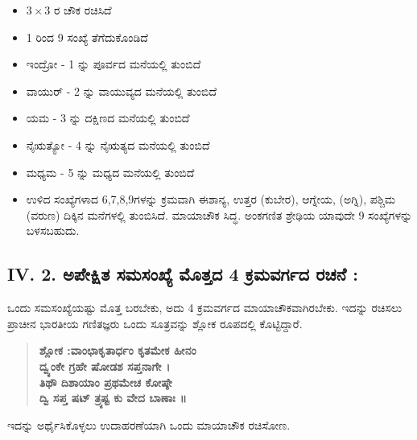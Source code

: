 \begin{itemize}
	\item $3 \times 3$ ರ ಚೌಕ ರಚಿಸಿದೆ
	\item 1 ರಿಂದ 9 ಸಂಖ್ಯೆ ತೆಗೆದುಕೊಂಡಿದೆ
	\item ಇಂದ್ರೋ - 1 ನ್ನು ಪೂರ್ವದ ಮನೆಯಲ್ಲಿ ತುಂಬಿದೆ
	\item ವಾಯುರ್ - 2 ನ್ನು ವಾಯುವ್ಯದ ಮನೆಯಲ್ಲಿ ತುಂಬಿದೆ
	\item ಯಮ - 3 ನ್ನು ದಕ್ಷಿಣದ ಮನೆಯಲ್ಲಿ ತುಂಬಿದೆ
	\item ನೈಋತ್ಯೋ - 4 ನ್ನು ನೈಋತ್ಯದ ಮನೆಯಲ್ಲಿ ತುಂಬಿದೆ
	\item ಮಧ್ಯಮ - 5 ನ್ನು ಮಧ್ಯದ ಮನೆಯಲ್ಲಿ ತುಂಬಿದೆ
	\item ಉಳಿದ ಸಂಖ್ಯೆಗಳಾದ 6,7,8,9ಗಳನ್ನು ಕ್ರಮವಾಗಿ ಈಶಾನ್ಯ, ಉತ್ತರ (ಕುಬೇರ), ಆಗ್ನೇಯ, (ಅಗ್ನಿ), ಪಶ್ಚಿಮ (ವರುಣ) ದಿಕ್ಕಿನ ಮನೆಗಳಲ್ಲಿ ತುಂಬಿಸಿದೆ. ಮಾಯಾಚೌಕ ಸಿದ್ಧ. ಅಂಕಗಣಿತ ಶ್ರೇಢಿಯ ಯಾವುದೇ 9 ಸಂಖ್ಯೆಗಳನ್ನು ಬಳಸಬಹುದು.
\end{itemize}

\subsection*{IV. 2. ಅಪೇಕ್ಷಿತ ಸಮಸಂಖ್ಯೆ ಮೊತ್ತದ 4 ಕ್ರಮವರ್ಗದ ರಚನೆ :}

ಒಂದು ಸಮಸಂಖ್ಯೆಯಷ್ಟು ಮೊತ್ತ ಬರಬೇಕು, ಅದು 4 ಕ್ರಮವರ್ಗದ ಮಾಯಾಚೌಕವಾಗಿರಬೇಕು. ಇದನ್ನು ರಚಿಸಲು ಪ್ರಾಚೀನ ಭಾರತೀಯ ಗಣಿತಜ್ಞರು ಒಂದು ಸೂತ್ರವನ್ನು ಶ್ಲೋಕ ರೂಪದಲ್ಲಿ ಕೊಟ್ಟಿದ್ದಾರೆ.
\begin{quote}
\textbf{ಶ್ಲೋಕ :ವಾಂಛಾಕೃತಾರ್ಧಂ ಕೃತಮೇಕ ಹೀನಂ}\\
\textbf{ದ್ವ್ಯಂಕೇ ಗ್ರಹೇ ಷೋಡಶ ಸಪ್ತನಾಗೇ ।}\\
\textbf{ತಿಥೌ ದಿಶಾಯಾಂ ಪ್ರಥಮೇಚ ಕೋಷ್ಠೇ}\\
\textbf{ದ್ವಿ ಸಪ್ತ ಷಟ್ ತ್ರ್ಯಷ್ಟ ಕು ವೇದ ಬಾಣಾಃ ॥}
\end{quote}

ಇದನ್ನು ಅರ್ಥೈಸಿಕೊಳ್ಳಲು ಉದಾಹರಣೆಯಾಗಿ ಒಂದು ಮಾಯಾಚೌಕ ರಚಿಸೋಣ.
\eject

